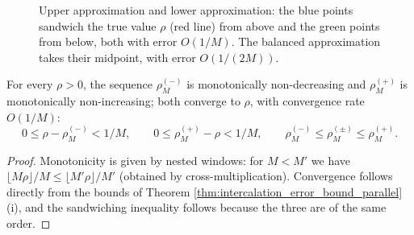 \begin{figure}[htbp]
\centering
{}
\caption{Upper approximation and lower approximation: the blue points sandwich the true value $\rho$ (red line) from above and the green points from below, both with error $O(1/M)$. The balanced approximation takes their midpoint, with error $O(1/(2M))$.}
\label{fig:bounded_approximation}
\end{figure}

\begin{proposition}\label{prop:sandwich_convergence_parallel}
For every $\rho>0$, the sequence $\rho^{(-)}_M$ is monotonically non-decreasing and $\rho^{(+)}_M$ is monotonically non-increasing; both converge to $\rho$, with convergence rate $O(1/M)$:
\[
0\le\rho-\rho^{(-)}_M<1/M,\qquad 0\le\rho^{(+)}_M-\rho<1/M,\qquad
\rho^{(-)}_M\le\rho^{(\pm)}_M\le\rho^{(+)}_M .
\]
\end{proposition}

\begin{proof}
Monotonicity is given by nested windows: for $M<M'$ we have $\lfloor M\rho\rfloor/M\le\lfloor M'\rho\rfloor/M'$ (obtained by cross-multiplication). Convergence follows directly from the bounds of Theorem \ref{thm:intercalation_error_bound_parallel}(i), and the sandwiching inequality follows because the three are of the same order.
\end{proof}

